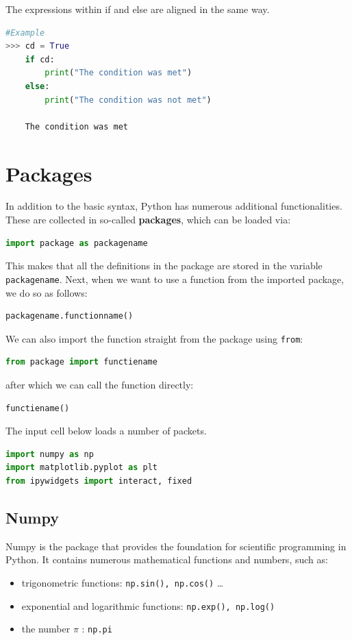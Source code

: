 The expressions within if and else are aligned in the same way. 

\begin{lstlisting}[language=Python]
#Example 
>>> cd = True
    if cd:
        print("The condition was met")
    else:
        print("The condition was not met")
        
    The condition was met
\end{lstlisting}

\section{Packages}
In addition to the basic syntax, Python has numerous additional functionalities. These are collected in so-called \textbf{packages}, which can be loaded via:

\begin{lstlisting}[language=Python]
	import package as packagename
\end{lstlisting}

This makes that all the definitions in the package are stored in the variable \lstinline|packagename|. Next, when we want to use a function from the imported package, we do so as follows:

\begin{lstlisting}[language=Python]
	packagename.functionname()
\end{lstlisting}

We can also import the function straight from the package using \lstinline|from|:

\begin{lstlisting}[language=Python]
	from package import functiename
\end{lstlisting}

after which we can call the function directly:

\begin{lstlisting}[language=Python]
	functiename()
\end{lstlisting}

The input cell below loads a number of packets.

\begin{lstlisting}[language=Python]
import numpy as np 
import matplotlib.pyplot as plt
from ipywidgets import interact, fixed
\end{lstlisting}

\subsection{Numpy}
Numpy is the package that provides the foundation for scientific programming in Python. It contains numerous mathematical functions and numbers, such as:
\begin{itemize}
	\item trigonometric functions: \lstinline|np.sin(), np.cos()| \ldots
	\item exponential and logarithmic functions: \lstinline|np.exp(), np.log()|
	\item the number $\pi$ : \lstinline|np.pi|
\end{itemize}

